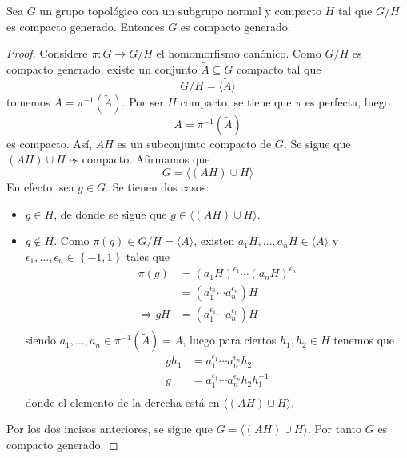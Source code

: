 \documentclass[12pt]{report}
\theoremstyle{largebreak}
\newcommand\cf[3]{\ensuremath{#1:#2\rightarrow#3}}
\newcommand{\gen}[1]{\ensuremath{\langle#1\rangle}}
\begin{document}
    \begin{theor}
        Sea $G$ un grupo topológico con un subgrupo normal y compacto $H$ tal que $G/H$ es compacto generado. Entonces $G$ es compacto generado.
    \end{theor}

    \begin{proof}
        Considere $\cf{\pi}{G}{G/H}$ el homomorfismo canónico. Como $G/H$ es compacto generado, existe un conjunto $\tilde{A}\subseteq G$ compacto tal que
        \begin{equation*}
            G/H=\gen{\tilde{A}}
        \end{equation*}
        tomemos $A=\pi^{-1}(\tilde{A})$. Por ser $H$ compacto, se tiene que $\pi$ es perfecta, luego
        \begin{equation*}
            A=\pi^{-1}(\tilde{A})
        \end{equation*}
        es compacto. Así, $AH$ es un subconjunto compacto de $G$. Se sigue que $(AH)\cup H$ es compacto. Afirmamos que
        \begin{equation*}
            G=\gen{(AH)\cup H}
        \end{equation*}
        En efecto, sea $g\in G$. Se tienen dos casos:
        \begin{itemize}
            \item $g\in H$, de donde se sigue que $g\in\gen{(AH)\cup H}$.
            \item $g\notin H$. Como $\pi(g)\in G/H=\gen{\tilde{A}}$, existen $a_1H,...,a_nH\in\gen{\tilde{A}}$ y $\epsilon_1,...,\epsilon_n\in\left\{-1,1\right\}$ tales que
            \begin{equation*}
                \begin{split}
                    \pi(g)&=(a_1H)^{\epsilon_1}\cdots(a_nH)^{\epsilon_n}\\
                    &=(a_1^{\epsilon_1}\cdots a_n^{\epsilon_n})H\\
                    \Rightarrow gH&=(a_1^{\epsilon_1}\cdots a_n^{\epsilon_n})H\\
                \end{split}
            \end{equation*}
            siendo $a_1,...,a_n\in\pi^{-1}(\tilde{A})=A$, luego para ciertos $h_1,h_2\in H$ tenemos que
            \begin{equation*}
                \begin{split}
                    gh_1&=a_1^{\epsilon_1}\cdots a_n^{\epsilon_n}h_2\\
                    g&=a_1^{\epsilon_1}\cdots a_n^{\epsilon_n}h_2h_1^{-1}\\
                \end{split}
            \end{equation*}
            donde el elemento de la derecha está en $\gen{(AH)\cup H}$.
        \end{itemize}
        Por los dos incisos anteriores, se sigue que $G=\gen{(AH)\cup H}$. Por tanto $G$ es compacto generado.
    \end{proof}
\end{document}
